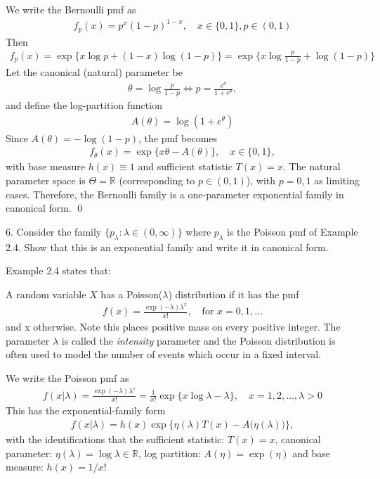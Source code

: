 \documentclass[10pt]{article}
\begin{document}
We write the Bernoulli pmf as 
\begin{gather*}
    f_p(x) = p^x(1 - p)^{1 - x}, \quad x\in \{0, 1\}, p\in (0, 1)
\end{gather*}
Then 
\begin{gather*}
    f_p(x) = \exp\{x \log p + (1 - x)\log(1 - p)\} = \exp\big\{x \log \frac{p}{1 - p} + \log(1 - p)\big\}
\end{gather*}
Let the canonical (natural) parameter be 
\begin{gather*}
    \theta = \log \frac{p}{1 - p} \iff p = \frac{e^\theta}{1 + e^\theta},
\end{gather*}
and define the log-partition function 
\begin{gather*}
    A(\theta) = \log(1 + e^\theta)
\end{gather*}
Since $A(\theta) = -\log(1 - p)$, the pmf becomes 
\begin{gather*}
    f_\theta(x) = \exp\{x\theta - A(\theta)\},\quad x \in \{0, 1\},
\end{gather*}
with base measure $h(x) \equiv 1 $ and sufficient statistic $T(x) = x $. The natural parameter space is $\Theta = \mathbb{R}$ (corresponding to $p\in (0, 1)$), with $p = 0, 1 $ as limiting cases. Therefore, the Bernoulli family is a one-parameter exponential family in canonical form. \qed

\newpage

6. Consider the family $\{p_\lambda : \lambda\in(0, \infty)\}$ where $p_\lambda $ is the Poisson pmf of Example 2.4. Show that this is an exponential family and write it in canonical form. 

Example 2.4 states that:

A random variable $X $ has a Poisson($\lambda $) distribution if it has the pmf 
\begin{gather*}
    f(x) = \frac{\exp(-\lambda)\lambda^x}{x!},\quad\text{for }x = 0, 1, …
\end{gather*}
and x otherwise. Note this places positive mass on every positive integer. The parameter $\lambda $ is called the \textit{intensity} parameter and the Poisson distribution is often used to model the number of events which occur in a fixed interval.

We write the Poisson pmf as 
\begin{gather*}
    f(x | \lambda) = \frac{\exp(-\lambda)\lambda^x}{x!} = \frac{1}{x!}\exp\{x \log \lambda - \lambda\},\quad x = 1, 2, …, \lambda > 0
\end{gather*}
This has the exponential-family form 
\begin{gather*}
    f(x | \lambda) = h(x)\exp\{\eta(\lambda)T(x) - A\big(\eta(\lambda)\big)\},
\end{gather*}
with the identifications that the sufficient statistic: $T(x) = x $, canonical parameter: $\eta(\lambda) = \log \lambda \in \mathbb{R}$, log partition: $A(\eta) = \exp(\eta)$ and base measure: $h(x) = 1 / x!$
\end{document}
